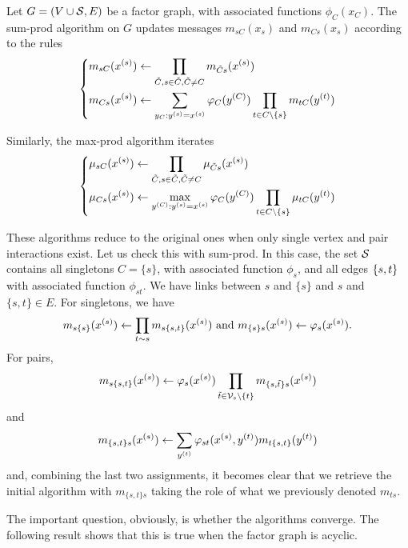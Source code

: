 \begin{definition}
\label{def:maxsumprod}
Let $G=(V\cup
{\mathcal S},E)$ be a factor graph, with associated functions
$\phi_C(x_C)$. The sum-prod algorithm on $G$ updates messages
$m_{sC}(x_s)$ and $m_{Cs}(x_s)$ according to the rules
\begin{equation}
\label{eq:sumprod}
\left\{
\begin{aligned}
&m_{sC}(x^{(s)}) \leftarrow \prod_{\tilde C, s\in \tilde C,  \tilde C\neq C} m_{\tilde C s}(x^{(s)})\\
&m_{Cs}(x^{(s)}) \leftarrow \sum_{y_{C}: y^{(s)} = x^{(s)}} \varphi_C(y^{(C)}) \prod_{t\in C\setminus \{s\}} m_{tC}(y^{(t)})
\end{aligned}
\right.
\end{equation}

Similarly, the max-prod algorithm iterates
\begin{equation}
\label{eq:maxprod}
\left\{
\begin{aligned}
&\mu_{sC}(x^{(s)}) \leftarrow \prod_{\tilde C, s\in \tilde C,  \tilde C\neq C} \mu_{\tilde
C s}(x^{(s)})\\
&\mu_{Cs}(x^{(s)}) \leftarrow \max_{y^{(C)}:y^{(s)}=x^{(s)}} \varphi_C(y^{(C)}) \prod_{t\in C\setminus \{s\}} \mu_{tC}(y^{(t)})\\
\end{aligned}
\right.
\end{equation}
\end{definition}
These algorithms reduce to the original ones when
only single vertex and pair interactions exist. Let us check this with 
sum-prod.  In this case, the set ${\mathcal S}$ contains all singletons $C=\{s\}$, with
associated function $\phi_s$, and all edges $\left\{ s,t \right\}$ with
associated function $\phi_{st}$. We have links between $s$ and $\{s\}$
and $s$ and $\{s,t\}\in E$. For singletons, we have
$$
m_{s\{s\}}(x^{(s)}) \leftarrow \prod_{t\sim s} m_{s\{s,t\}} (x^{(s)}) \text{
and } m_{\{s\}s}(x^{(s)}) \leftarrow \varphi_s(x^{(s)}).
$$
For pairs,
$$
m_{s\{s,t\}}(x^{(s)}) \leftarrow \varphi_s(x^{(s)}) \prod_{\tilde t\in{\mathcal V}_s\setminus \{t\}}
m_{\{s,\tilde t\}s} (x^{(s)})
$$
and
$$
m_{\{s,t\}s}(x^{(s)}) \leftarrow \sum_{y^{(t)}} \varphi_{st}(x^{(s)},y^{(t)})
m_{t\{s,t\}}(y^{(t)})
$$
and, combining the last two assignments, it becomes clear that we retrieve the initial algorithm with
$m_{\{s,t\}s}$ taking the role of what we previously denoted $m_{ts}$.

The important question, obviously, is whether the algorithms
converge. The following result shows that this is true when the factor
graph is acyclic.

